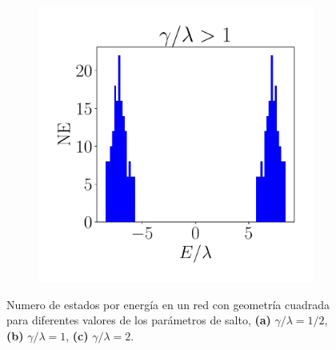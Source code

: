 \begin{figure}[h!]
\begin{subfigure}[b!]{0.3 \textwidth}
     \end{subfigure}\hspace*{1em}
     \begin{subfigure}[b!]{0.3 \textwidth}
         \caption{}
         \includegraphics[width=\textwidth]{Imagenes/Resultados_Hoti_Cuadrado/bars_square3.pdf}
     \end{subfigure}\hspace*{1em}\vspace*{-0.5em}
        \caption{Numero de estados por energía en un red con geometría cuadrada para diferentes valores de los parámetros de salto, \textbf{(a)} $\gamma /\lambda = 1/2$, \textbf{(b)} $\gamma /\lambda = 1$, \textbf{(c)} $\gamma /\lambda = 2$.}
        \label{fig:Dos_Cuadrado}
\end{figure}